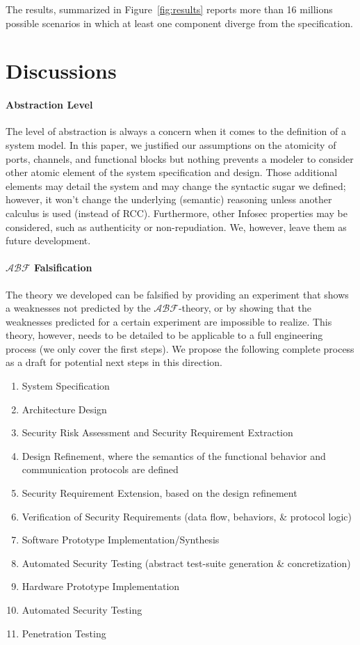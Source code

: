 \documentclass[conference]{IEEEtran}
\newcommand{\assertionRegion}{\mathcal{A}}
\newcommand{\beliefRegion}{\mathcal{B}}
\newcommand{\factRegion}{\mathcal{F}}
\newcommand{\abftheory}{\assertionRegion\beliefRegion\factRegion}
\begin{document}
The results, summarized in Figure~\ref{fig:results} reports more than 16 millions
possible scenarios in which at least one component diverge from the specification.

\section{Discussions}\label{sec:discussion}
\paragraph{Abstraction Level}
The level of abstraction is always a concern when it comes to the definition of
a system model.  In this paper, we justified our assumptions on the atomicity
of ports, channels, and functional blocks but nothing prevents a modeler to
consider other atomic element of the system specification and design.  Those
additional elements may detail the system and may change the syntactic sugar we
defined; however, it won't change the underlying (semantic) reasoning unless
another calculus is used (instead of RCC).  Furthermore, other Infosec
properties may be considered, such as authenticity or non-repudiation. We,
however, leave them as future development.

\paragraph{$\abftheory$ Falsification} The theory we developed can be falsified
by providing an experiment that shows a weaknesses not predicted by the
$\abftheory$-theory, or by showing that the weaknesses predicted for a certain
experiment are impossible to realize.  This theory, however, needs to be
detailed to be applicable to a full engineering process (we only cover the
first steps).  We propose the following complete process as a draft for
potential next steps in this direction.
\begin{enumerate}
\item System Specification
\item Architecture Design
\item Security Risk Assessment and Security Requirement Extraction
\item Design Refinement, where the semantics of the functional behavior and
	communication protocols are defined 
\item Security Requirement Extension, based on the design refinement
\item Verification of Security Requirements (data flow, behaviors, \& protocol
	logic)
\item Software Prototype Implementation/Synthesis
\item Automated Security Testing (abstract test-suite generation \&
	concretization)
\item Hardware Prototype Implementation
\item Automated Security Testing
\item Penetration Testing
  \end{enumerate}
\end{document}
